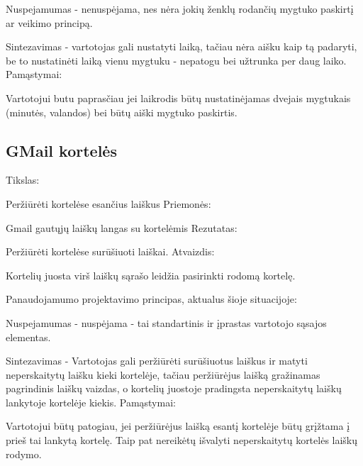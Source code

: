 ﻿\documentclass[a4paper, 12pt]{article}
\begin{document}
		Nuspejamumas - nenuspėjama, nes nėra jokių ženklų rodančių mygtuko paskirtį ar veikimo principą.
		
		Sintezavimas - vartotojas gali nustatyti laiką, tačiau nėra aišku kaip tą padaryti, be
		to nustatinėti laiką vienu mygtuku - nepatogu bei užtrunka per daug laiko.\newline		
		Pamąstymai:
		
		Vartotojui butu paprasčiau jei laikrodis būtų nustatinėjamas dvejais mygtukais (minutės, valandos)
		bei būtų aiški mygtuko paskirtis.
		
	\subsection{GMail kortelės}
		Tikslas:
		
		Peržiūrėti kortelėse esančius laiškus\newline
		Priemonės:
		
		Gmail gautųjų laiškų langas su kortelėmis\newline
		Rezutatas:
		
		Peržiūrėti kortelėse surūšiuoti laiškai.\newline
		Atvaizdis:
		
		Kortelių juosta virš laiškų sąrašo leidžia pasirinkti rodomą kortelę.\newline
		
		Panaudojamumo projektavimo principas, aktualus šioje situacijoje:
		
		Nuspejamumas - nuspėjama - tai standartinis ir įprastas vartotojo sąsajos elementas.
		
		Sintezavimas - Vartotojas gali peržiūrėti surūšiuotus laiškus ir matyti neperskaitytų laišku kieki kortelėje, tačiau peržiūrėjus laišką
		gražinamas pagrindinis laiškų vaizdas, o kortelių juostoje pradingsta neperskaitytų laiškų lankytoje kortelėje kiekis.\newline		
		Pamąstymai:
		
		Vartotojui būtų patogiau, jei peržiūrėjus laišką esantį kortelėje būtų grįžtama į prieš tai lankytą kortelę.
		Taip pat nereikėtų išvalyti neperskaitytų kortelės laiškų rodymo.
	
\end{document}
